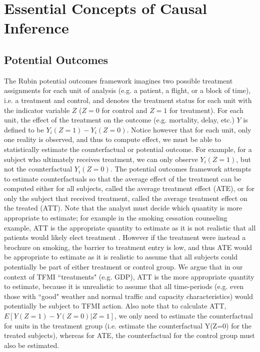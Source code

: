 \documentclass[conference]{IEEEtran}
\begin{document}
\section{Essential Concepts of Causal Inference}
\subsection{Potential Outcomes}
The Rubin potential outcomes framework \cite{rubin1974estimating} imagines two possible treatment assignments for each unit of analysis (e.g. a patient, a flight, or a block of time), i.e. a treatment and control, and denotes the treatment status for each unit with the indicator variable $Z$ ($Z=0$ for control and $Z=1$ for treatment).  For each unit, the effect of the treatment on the outcome (e.g. mortality, delay, etc.) $Y$ is defined to be $Y_i(Z=1) - Y_i(Z=0)$.  Notice however that for each unit, only one reality is observed, and thus to compute effect, we must be able to statistically estimate the counterfactual or potential outcome.  For example, for a subject who ultimately receives treatment, we can only observe $Y_i(Z=1)$, but not the counterfactual $Y_i(Z=0)$.  The potential outcomes framework attempts to estimate counterfactuals so that the average effect of the treatment can be computed either for all subjects, called the average treatment effect (ATE),  or for only the subject that received treatment, called the average treatment effect on the treated (ATT).  Note that the analyst must decide which quantity is more appropriate to estimate; for example in the smoking cessation counseling example, ATT is the appropriate quantity to estimate as it is not realistic that all patients would likely elect treatment \cite{austin2011tutorial}.  However if the treatment were instead a brochure on smoking, the barrier to treatment entry is low, and thus ATE would be appropriate to estimate as it is realistic to assume that all subjects could potentially be part of either treatment or control group.  We argue  that in our context of TFMI ``treatments" (e.g. GDP), ATT is the more appropriate quantity to estimate, because it is unrealistic to assume that all time-periods (e.g. even those with ``good" weather and normal traffic and capacity characteristics) would potentially be subject to TFMI action.  Also note that to calculate ATT, $E[Y(Z=1) - Y(Z=0)| Z=1]$, we only need to estimate the counterfactual for units in the treatment group (i.e. estimate the counterfactual Y(Z=0) for the treated subjects), whereas for ATE, the counterfactual for the control group must also be estimated.  
\end{document}
